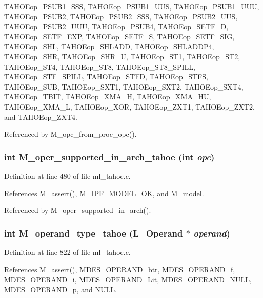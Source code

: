 TAHOEop\_\-PSUB1\_\-SSS, TAHOEop\_\-PSUB1\_\-UUS, TAHOEop\_\-PSUB1\_\-UUU, TAHOEop\_\-PSUB2, TAHOEop\_\-PSUB2\_\-SSS, TAHOEop\_\-PSUB2\_\-UUS, TAHOEop\_\-PSUB2\_\-UUU, TAHOEop\_\-PSUB4, TAHOEop\_\-SETF\_\-D, TAHOEop\_\-SETF\_\-EXP, TAHOEop\_\-SETF\_\-S, TAHOEop\_\-SETF\_\-SIG, TAHOEop\_\-SHL, TAHOEop\_\-SHLADD, TAHOEop\_\-SHLADDP4, TAHOEop\_\-SHR, TAHOEop\_\-SHR\_\-U, TAHOEop\_\-ST1, TAHOEop\_\-ST2, TAHOEop\_\-ST4, TAHOEop\_\-ST8, TAHOEop\_\-ST8\_\-SPILL, TAHOEop\_\-STF\_\-SPILL, TAHOEop\_\-STFD, TAHOEop\_\-STFS, TAHOEop\_\-SUB, TAHOEop\_\-SXT1, TAHOEop\_\-SXT2, TAHOEop\_\-SXT4, TAHOEop\_\-TBIT, TAHOEop\_\-XMA\_\-H, TAHOEop\_\-XMA\_\-HU, TAHOEop\_\-XMA\_\-L, TAHOEop\_\-XOR, TAHOEop\_\-ZXT1, TAHOEop\_\-ZXT2, and TAHOEop\_\-ZXT4.

Referenced by M\_\-opc\_\-from\_\-proc\_\-opc().
\subsubsection{\setlength{\rightskip}{0pt plus 5cm}int M\_\-oper\_\-supported\_\-in\_\-arch\_\-tahoe (int {\em opc})}\label{ml__tahoe_8c_3dc904fa2e7528b127b4eb1cd19c004f}




Definition at line 480 of file ml\_\-tahoe.c.

References M\_\-assert(), M\_\-IPF\_\-MODEL\_\-OK, and M\_\-model.

Referenced by M\_\-oper\_\-supported\_\-in\_\-arch().
\subsubsection{\setlength{\rightskip}{0pt plus 5cm}int M\_\-operand\_\-type\_\-tahoe (L\_\-Operand $\ast$ {\em operand})}\label{ml__tahoe_8c_e996d5f4bafca5d9e3a7f7e2abbdea57}




Definition at line 822 of file ml\_\-tahoe.c.

References M\_\-assert(), MDES\_\-OPERAND\_\-btr, MDES\_\-OPERAND\_\-f, MDES\_\-OPERAND\_\-i, MDES\_\-OPERAND\_\-Lit, MDES\_\-OPERAND\_\-NULL, MDES\_\-OPERAND\_\-p, and NULL.

